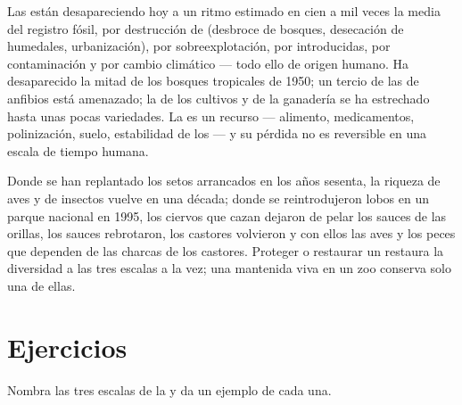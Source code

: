 \begin{proposition}\label{prop:g10:biodiversity-scales:present}
Las  están desapareciendo hoy a un ritmo estimado en cien a mil
veces la media del registro fósil, por destrucción de 
(desbroce de bosques, desecación de humedales, urbanización), por
sobreexplotación, por  introducidas, por contaminación y por
cambio climático --- todo ello de origen humano. Ha desaparecido la
mitad de los bosques tropicales de 1950; un tercio de las  de
anfibios está amenazado; la  de los cultivos y de la
ganadería se ha estrechado hasta unas pocas variedades. La
 es un recurso --- alimento, medicamentos, polinización,
suelo, estabilidad de los  --- y su pérdida no es reversible
en una escala de tiempo humana.
\end{proposition}
\admitted

\begin{example}\label{ex:g10:biodiversity-scales:reversing}
Donde se han replantado los setos arrancados en los años sesenta, la
riqueza de aves y de insectos vuelve en una década; donde se
reintrodujeron lobos en un parque nacional en 1995, los ciervos que
cazan dejaron de pelar los sauces de las orillas, los sauces
rebrotaron, los castores volvieron y con ellos las aves y los peces que
dependen de las charcas de los castores. Proteger o restaurar un
 restaura la diversidad a las tres escalas a la vez; una
 mantenida viva en un zoo conserva solo una de ellas.
\end{example}

\section{Ejercicios}

\begin{exercise}[$\star$]\label{exo:g10:biodiversity-scales:1}
Nombra las tres escalas de la  y da un ejemplo de cada
una.
\end{exercise}

